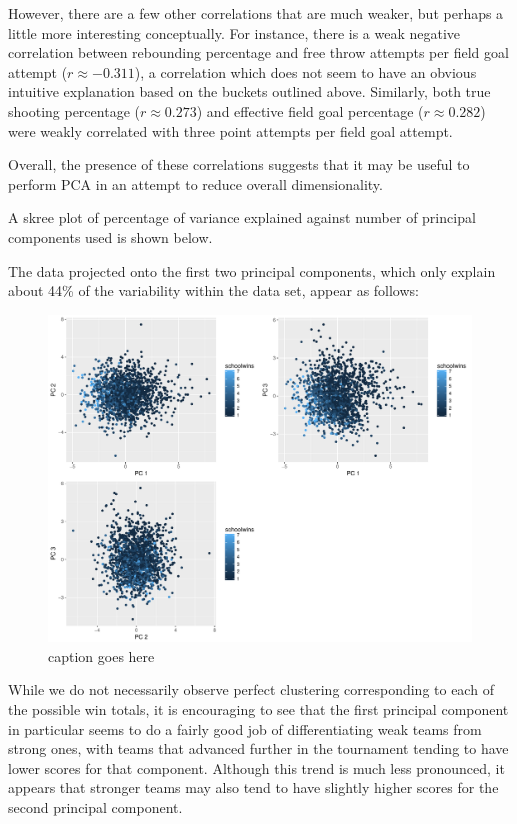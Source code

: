 \documentclass[10pt,a4paper, hidelinks]{article} %
\begin{document}
However, there are a few other correlations that are much weaker, but perhaps a little more interesting conceptually. For instance, there is a weak negative correlation between rebounding percentage and free throw attempts per field goal attempt ($r \approx -0.311$), a correlation which does not seem to have an obvious intuitive explanation based on the buckets outlined above. Similarly, both true shooting percentage ($r \approx 0.273$) and effective field goal percentage ($r \approx 0.282$) were weakly correlated with three point attempts per field goal attempt.

Overall, the presence of these correlations suggests that it may be useful to perform PCA in an attempt to reduce overall dimensionality.

A skree plot of percentage of variance explained against number of principal components used is shown below. 


The data projected onto the first two principal components, which only explain about 44\% of the variability within the data set, appear as follows:

\begin{figure}[H]
	\centering
	\includegraphics[width=0.7\linewidth]{../fig/PrinComps}
	\caption{caption goes here}
	\label{fig:princomps}
\end{figure}


While we do not necessarily observe perfect clustering corresponding to each of the possible win totals, it is encouraging to see that the first principal component in particular seems to do a fairly good job of differentiating weak teams from strong ones, with teams that advanced further in the tournament tending to have lower scores for that component. Although this trend is much less pronounced, it appears that stronger teams may also tend to have slightly higher scores for the second principal component. 
\end{document}
